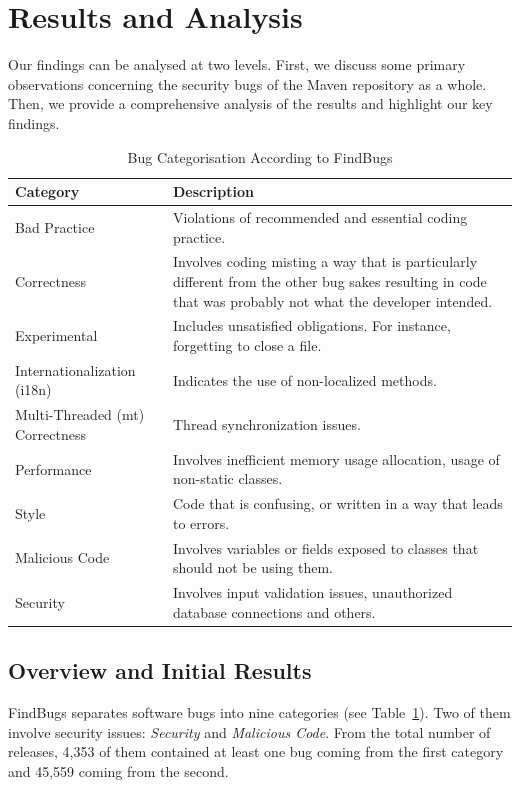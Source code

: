 \documentclass[letterpaper,twocolumn,10pt]{article}
\begin{document}
\section{Results and Analysis}
\label{sec:res}

Our findings can be analysed at two levels. First, we discuss some
primary observations concerning the security bugs of the Maven repository as a whole.
Then, we provide a comprehensive analysis of the results and highlight our key findings.

\begin{table}[t]
\centering
\caption{Bug Categorisation According to FindBugs}
\label{tbl:bug-cat}
\begin{tabular}{l p{29em}}
\hline
Category & Description\\
\hline
Bad Practice & Violations of recommended and essential
coding practice. \\
Correctness & Involves coding misting a way that is particularly different from the other bug sakes resulting in code
that was probably not what the developer intended. \\
Experimental & Includes unsatisfied obligations. For instance,
forgetting to close a file. \\
Internationalization (i18n) & Indicates the use of non-localized methods. \\
Multi-Threaded ({\sc mt}) Correctness & Thread synchronization issues. \\
Performance & Involves inefficient memory usage allocation, usage 
of non-static classes. \\
Style & Code that is confusing, or
written in a way that leads to errors.\\
Malicious Code & Involves variables or fields exposed to classes that should
not be using them. \\
Security & Involves input validation issues, unauthorized database connections
and others. \\
\hline
\end{tabular}
\end{table}

\subsection{Overview and Initial Results}
\label{sec:overview}

FindBugs separates software bugs into nine categories (see
Table~\ref{tbl:bug-cat}). Two of them involve security issues: {\it Security} and {\it
Malicious Code}. From the total number of releases, 4,353 of them contained
at least one bug coming from the first category
and 45,559 coming from the second.
\end{document}

